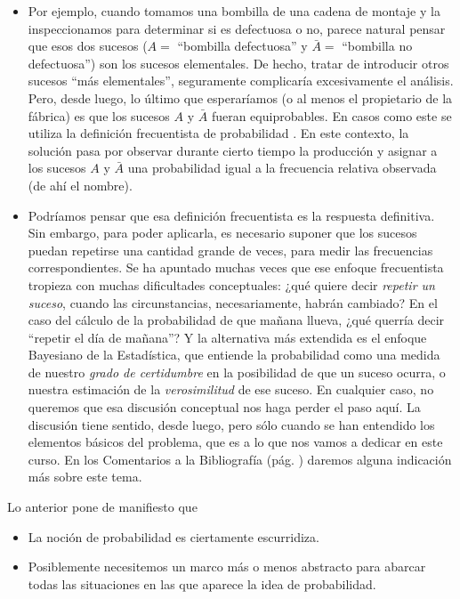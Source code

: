 \begin{itemize}
\item Por ejemplo, cuando tomamos una bombilla de una cadena de montaje y la
inspeccionamos para determinar si es defectuosa o no, parece natural pensar que esos dos sucesos ($A=$ ``bombilla defectuosa'' y $\bar A=$ ``bombilla no defectuosa'') son los sucesos elementales. De hecho, tratar de introducir otros sucesos ``más elementales'', seguramente complicaría excesivamente el análisis.  Pero, desde luego, lo \'ultimo que esperar\'iamos (o al menos el propietario de la f\'abrica) es que los sucesos $A$ y $\bar{A}$  fueran equiprobables.
En casos como este se utiliza la {\sf definici\'on frecuentista de probabilidad}
. En este contexto, la soluci\'on pasa
por observar durante cierto tiempo la producci\'on y asignar a los sucesos $A$ y $\bar{A}$ una probabilidad igual a la frecuencia relativa observada (de ah\'i el nombre).

\item Podríamos pensar que esa definición frecuentista es la respuesta definitiva. Sin embargo, para poder aplicarla,  es necesario suponer que los sucesos puedan repetirse
una cantidad grande de veces, para medir las frecuencias correspondientes. Se ha apuntado muchas veces que ese enfoque frecuentista tropieza con muchas dificultades conceptuales: ¿qué quiere decir {\em repetir un suceso}, cuando las circunstancias, necesariamente, habrán cambiado? En el caso del cálculo de la probabilidad de que mañana llueva, ¿qué querría decir ``repetir el día de mañana''? Y la alternativa más extendida es el {\sf enfoque Bayesiano} de la Estadística, que entiende la probabilidad como una medida de nuestro {\em grado de certidumbre} en la posibilidad de que un suceso ocurra, o nuestra estimación de la {\em verosimilitud} de ese suceso. En cualquier caso, no queremos que esa discusión conceptual nos haga perder el paso aquí. La discusión tiene sentido, desde luego, pero sólo cuando se han entendido los elementos básicos del problema, que es a lo que nos vamos a dedicar en este curso. En los Comentarios a la Bibliografía (pág. \pageref{apendice:comentarioBibliografia}) daremos alguna indicación más sobre este tema.


\end{itemize}

Lo anterior pone de manifiesto que
\begin{itemize}
	\item La noci\'on de probabilidad es ciertamente escurridiza.
	\item Posiblemente necesitemos un marco m\'as o menos abstracto para abarcar
		todas las situaciones en las que aparece la idea de probabilidad.
\end{itemize}



